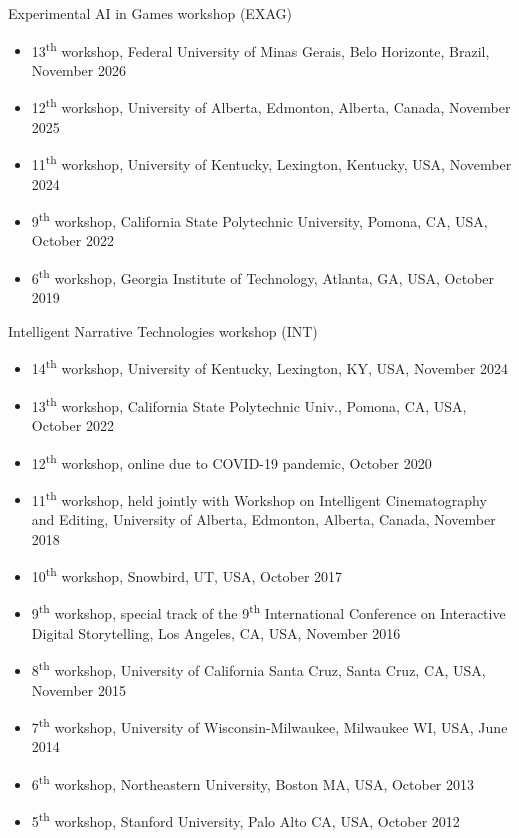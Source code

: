 \documentclass{cv}
\begin{document}
\noindent Experimental AI in Games workshop (EXAG)
\begin{itemize}
	\item 13\textsuperscript{th} workshop, Federal University of Minas Gerais, Belo Horizonte, Brazil, November 2026
	\item 12\textsuperscript{th} workshop, University of Alberta, Edmonton, Alberta, Canada, November 2025
	\item 11\textsuperscript{th} workshop, University of Kentucky, Lexington, Kentucky, USA, November 2024
	\item 9\textsuperscript{th} workshop, California State Polytechnic University, Pomona, CA, USA, October 2022
	\item 6\textsuperscript{th} workshop, Georgia Institute of Technology, Atlanta, GA, USA, October 2019
\end{itemize}

\noindent Intelligent Narrative Technologies workshop (INT)
\begin{itemize}
	\item 14\textsuperscript{th} workshop, University of Kentucky, Lexington, KY, USA, November 2024
	\item 13\textsuperscript{th} workshop, California State Polytechnic Univ., Pomona, CA, USA, October 2022
	\item 12\textsuperscript{th} workshop, online due to COVID-19 pandemic, October 2020
	\item 11\textsuperscript{th} workshop, held jointly with Workshop on Intelligent Cinematography and Editing, University of Alberta, Edmonton, Alberta, Canada, November 2018
	\item 10\textsuperscript{th} workshop, Snowbird, UT, USA, October 2017
	\item 9\textsuperscript{th} workshop, special track of the 9\textsuperscript{th} International Conference on Interactive Digital Storytelling, Los Angeles, CA, USA, November 2016
	\item 8\textsuperscript{th} workshop, University of California Santa Cruz, Santa Cruz, CA, USA, November 2015
	\item 7\textsuperscript{th} workshop, University of Wisconsin-Milwaukee, Milwaukee WI, USA, June 2014
	\item 6\textsuperscript{th} workshop, Northeastern University, Boston MA, USA, October 2013
	\item 5\textsuperscript{th} workshop, Stanford University, Palo Alto CA, USA, October 2012
\end{itemize}
\end{document}
